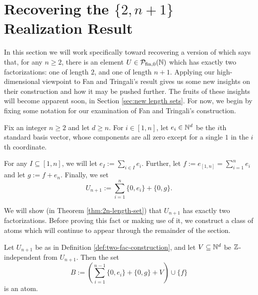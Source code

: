 \section{Recovering the $\{2,n+1\}$ Realization Result} \label{sec:recovering length sets}
In this section we will work specifically toward recovering a version of \cite[Proposition 4.10]{fan-tringali18} which says that, for any $n\ge 2$, there is an element $U\in {\mathcal{P}_{\textrm{fin},0}(\mathbb{N})}$ which has exactly two factorizations: one of length $2$, and one of length $n+1$.
Applying our high-dimensional viewpoint to Fan and Tringali's result gives us some new insights on their construction and how it may be pushed further.
The fruits of these insights will become apparent soon, in Section \ref{sec:new length sets}.
For now, we begin by fixing some notation for our examination of Fan and Tringali's construction.

\begin{defn} \label{def:two-fac-construction}
	Fix an integer $n\ge 2$ and let $d\ge n$.
	For $i\in [ 1,n]$, let $e_i \in \mathbb{N}^d$ be the $i$th standard basis vector, whose components are all zero except for a single $1$ in the $i$th coordinate.
	
	For any $I \subseteq [ 1,n ]$, we will let $e_I := \sum_{i\in I} e_i$.
	Further, let $f := e_{[ 1,n ]} = \sum_{i=1}^n e_i$ and let $g := f + e_n$.
	Finally, we set
	\[U_{n+1} := \sum_{i=1}^n \{0,e_i\} + \{0,g\}.\]
\end{defn}

We will show (in Theorem \ref{thm:2n-length-set}) that $U_{n+1}$ has exactly two factorizations. 
Before proving this fact or making use of it, we construct a class of atoms which will continue to appear through the remainder of the section.

\begin{lemma} \label{lem:large-atom-two-fac}
	Let $U_{n+1}$ be as in Definition \ref{def:two-fac-construction}, and let $V\subseteq \mathbb{N}^d$ be $\mathbb{Z}$-independent from $U_{n+1}$.
	Then the set
	\[ B:= \left( \sum_{i=1}^{n-1} \{0,e_i\} + \{0,g\} + V \right) \cup \{f\} \]
	is an atom.
\end{lemma}

